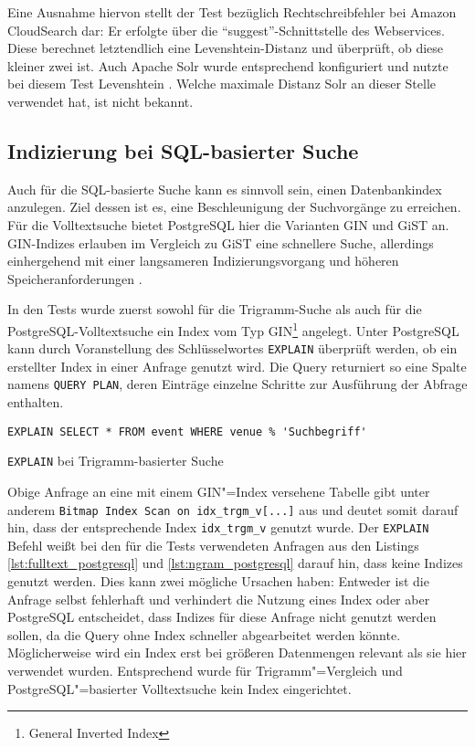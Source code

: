 Eine Ausnahme hiervon stellt der Test bezüglich Rechtschreibfehler bei Amazon CloudSearch dar: Er erfolgte über die \enquote{suggest}-Schnittstelle des Webservices. Diese berechnet letztendlich eine Levenshtein-Distanz und überprüft, ob diese kleiner zwei ist. Auch Apache Solr wurde entsprechend konfiguriert und nutzte bei diesem Test Levenshtein \cite[S. 315]{Grainger.2014}. Welche maximale Distanz Solr an dieser Stelle verwendet hat, ist nicht bekannt.

\subsection{Indizierung bei SQL-basierter Suche}
\label{sec:eval_indices}

Auch für die SQL-basierte Suche kann es sinnvoll sein, einen Datenbankindex anzulegen. Ziel dessen ist es, eine Beschleunigung der Suchvorgänge zu erreichen. Für die Volltextsuche bietet PostgreSQL hier die Varianten GIN und GiST an. GIN-Indizes erlauben im Vergleich zu GiST eine schnellere Suche, allerdings einhergehend mit einer langsameren Indizierungsvorgang und höheren Speicheranforderungen \cite{ThePostgreSQLGlobalDevelopmentGroup.2016}.

In den Tests wurde zuerst sowohl für die Trigramm-Suche als auch für die PostgreSQL-Volltextsuche ein Index vom Typ GIN\footnote{General Inverted Index} angelegt. Unter PostgreSQL kann durch Voranstellung des Schlüsselwortes \texttt{EXPLAIN} überprüft werden, ob ein erstellter Index in einer Anfrage genutzt wird. Die Query returniert so eine Spalte namens \texttt{QUERY PLAN}, deren Einträge einzelne Schritte zur Ausführung der Abfrage enthalten.


\begin{listing}[ht]
\begin{verbatim}
EXPLAIN SELECT * FROM event WHERE venue % 'Suchbegriff'
\end{verbatim}
\caption{\texttt{EXPLAIN} bei Trigramm-basierter Suche}
\label{lst:ngram_postgresql_explain}
\end{listing}

Obige Anfrage an eine mit einem GIN"=Index versehene Tabelle gibt unter anderem \texttt{Bitmap Index Scan on idx\_trgm\_v[...]} aus und deutet somit darauf hin, dass der entsprechende Index \texttt{idx\_trgm\_v} genutzt wurde. Der \texttt{EXPLAIN} Befehl weißt bei den für die Tests verwendeten Anfragen aus den Listings \ref{lst:fulltext_postgresql} und \ref{lst:ngram_postgresql} darauf hin, dass keine Indizes genutzt werden. Dies kann zwei mögliche Ursachen haben: Entweder ist die Anfrage selbst fehlerhaft und verhindert die Nutzung eines Index oder aber PostgreSQL entscheidet, dass Indizes für diese Anfrage nicht genutzt werden sollen, da die Query ohne Index schneller abgearbeitet werden könnte. Möglicherweise wird ein Index erst bei größeren Datenmengen relevant als sie hier verwendet wurden. Entsprechend wurde für Trigramm"=Vergleich und PostgreSQL"=basierter Volltextsuche kein Index eingerichtet.

